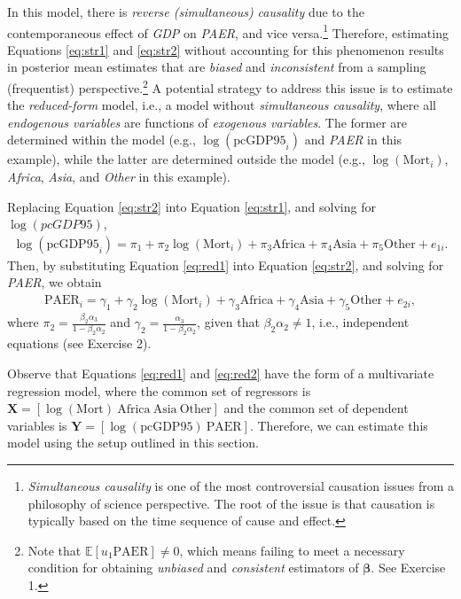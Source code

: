 In this model, there is \textit{reverse (simultaneous) causality} due to the contemporaneous effect of \textit{GDP} on \textit{PAER}, and vice versa.\footnote{\textit{Simultaneous causality} is one of the most controversial causation issues from a philosophy of science perspective. The root of the issue is that causation is typically based on the time sequence of cause and effect.} Therefore, estimating Equations \ref{eq:str1} and \ref{eq:str2} without accounting for this phenomenon results in posterior mean estimates that are \textit{biased} and \textit{inconsistent} from a sampling (frequentist) perspective.\footnote{Note that $\mathbb{E}[u_1\text{PAER}]\neq 0$, which means failing to meet a necessary condition for obtaining \textit{unbiased} and \textit{consistent} estimators of $\bm{\beta}$. See Exercise 1.} A potential strategy to address this issue is to estimate the \textit{reduced-form} model, i.e., a model without \textit{simultaneous causality}, where all \textit{endogenous variables} are functions of \textit{exogenous variables}. The former are determined within the model (e.g., $\log(\text{pcGDP95}_i)$ and \textit{PAER} in this example), while the latter are determined outside the model (e.g., $\log(\text{Mort}_i)$, \textit{Africa}, \textit{Asia}, and \textit{Other} in this example).

Replacing Equation \ref{eq:str2} into Equation \ref{eq:str1}, and solving for $\log(\textit{pcGDP95})$,
\begin{align}\label{eq:red1}
	\log(\text{pcGDP95}_i)=\pi_1+\pi_2\log(\text{Mort}_i)+\pi_3 \text{Africa}+\pi_4 \text{Asia}+\pi_5 \text{Other}+e_{1i}.   
\end{align}
Then, by substituting Equation \ref{eq:red1} into Equation \ref{eq:str2}, and solving for \textit{PAER}, we obtain
\begin{align}\label{eq:red2}
	\text{PAER}_i = \gamma_1 + \gamma_2 \log(\text{Mort}_i) + \gamma_3 \text{Africa} + \gamma_4 \text{Asia} + \gamma_5 \text{Other} + e_{2i},
\end{align}
where $\pi_2 = \frac{\beta_2\alpha_3}{1 - \beta_2\alpha_2}$ and $\gamma_2 = \frac{\alpha_3}{1 - \beta_2\alpha_2}$, given that $\beta_2 \alpha_2 \neq 1$, i.e., independent equations (see Exercise 2).

Observe that Equations \ref{eq:red1} and \ref{eq:red2} have the form of a multivariate regression model, where the common set of regressors is $\bm{X} = \left[\log(\text{Mort}) \ \text{Africa} \ \text{Asia} \ \text{Other}\right]$ and the common set of dependent variables is $\bm{Y} = \left[\log(\text{pcGDP95}) \ \text{PAER}\right]$. Therefore, we can estimate this model using the setup outlined in this section.

